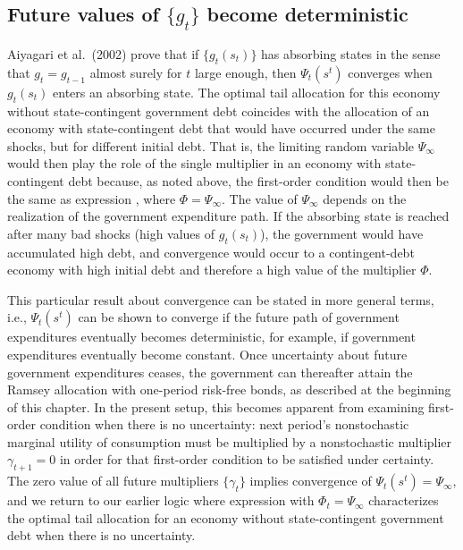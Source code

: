 \subsection{Future values of $\{g_t\}$ become deterministic}
Aiyagari et al.\ (2002) prove that if $\{g_t(s_t)\}$ has absorbing states
in the sense that $g_t = g_{t-1}$ almost surely for $t$ large enough,
then $\Psi_t(s^t)$ converges when $g_t(s_t)$ enters an absorbing state.
The optimal tail allocation for this economy without state-contingent
government debt coincides with the allocation of an economy with
state-contingent debt that would have occurred under the same
shocks, but for different initial debt. That is, the limiting random
variable $\Psi_\infty$ would then play the role of the single multiplier
in an economy with state-contingent debt because, as noted above,
the first-order condition  would then be the same
as expression , where $\Phi=\Psi_\infty$. The value of $\Psi_\infty$
depends on the realization of the government expenditure path. If the
absorbing state is reached after many bad shocks (high values of
$g_t(s_t)$), the government would have accumulated high debt, and
convergence would occur to a contingent-debt economy with
high initial debt and therefore a high value of the multiplier
$\Phi$.

This particular result about convergence
can be stated in more general terms, i.e., $\Psi_t(s^t)$ can
be shown to converge if the future path of government expenditures
eventually  becomes deterministic, for example, if government expenditures eventually  become
 constant. Once uncertainty about future government expenditures ceases, the
government can thereafter  attain the Ramsey allocation
with one-period risk-free bonds, as described at the beginning of
this chapter. In the present setup, this becomes
apparent from examining first-order condition 
when there is no uncertainty: next period's nonstochastic
marginal utility of consumption must be multiplied
by a nonstochastic multiplier $\gamma_{t+1}=0$ in order for
that first-order condition to be satisfied under certainty.
The zero value of all future multipliers $\{\gamma_t\}$
implies convergence of $\Psi_t(s^t)=\Psi_\infty$, and we return  to our earlier logic where expression 
with $\Phi_t=\Psi_\infty$
characterizes the optimal tail allocation for an
economy without state-contingent government debt when there
is no uncertainty.


